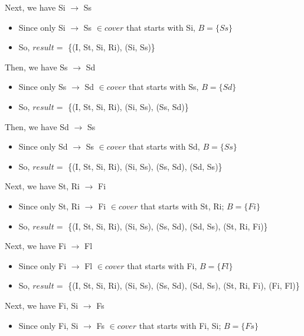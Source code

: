 \documentclass[12pt]{article}
\begin{document}
\begin{enumerate}
\begin{itemize}
        \end{itemize}
        Next, we have Si $\longrightarrow$ Ss
        \begin{itemize}
          \item Since only Si $\longrightarrow$ Ss $\in cover$ that starts with
                Si, $B = \{Ss\}$
          \item So, $result =$ \{(I, St, Si, Ri), (Si, Ss)\}
        \end{itemize}
        Then, we have Ss $\longrightarrow$ Sd
        \begin{itemize}
          \item Since only Ss $\longrightarrow$ Sd $\in cover$ that starts with
                Ss, $B = \{Sd\}$
          \item So, $result =$ \{(I, St, Si, Ri), (Si, Ss), (Ss, Sd)\}
        \end{itemize}
        Then, we have Sd $\longrightarrow$ Ss
        \begin{itemize}
          \item Since only Sd $\longrightarrow$ Ss $\in cover$ that starts with
                Sd, $B = \{Ss\}$
          \item So, $result =$ \{(I, St, Si, Ri), (Si, Ss), (Ss, Sd), (Sd, Ss)\}
        \end{itemize}
        Next, we have St, Ri $\longrightarrow$ Fi
        \begin{itemize}
          \item Since only St, Ri $\longrightarrow$ Fi $\in cover$ that starts
                with St, Ri; $B = \{Fi\}$
          \item So, $result =$ \{(I, St, Si, Ri), (Si, Ss), (Ss, Sd), (Sd, Ss),
                (St, Ri, Fi)\}
        \end{itemize}
        Next, we have Fi $\longrightarrow$ Fl
        \begin{itemize}
          \item Since only Fi $\longrightarrow$ Fl $\in cover$ that starts with
                Fi, $B = \{Fl\}$
          \item So, $result =$ \{(I, St, Si, Ri), (Si, Ss), (Ss, Sd), (Sd, Ss),
                (St, Ri, Fi), (Fi, Fl)\}
        \end{itemize}
        Next, we have Fi, Si $\longrightarrow$ Fs
        \begin{itemize}
          \item Since only Fi, Si $\longrightarrow$ Fs $\in cover$ that starts
                with Fi, Si; $B = \{Fs\}$

\end{itemize}
\end{enumerate}
\end{document}
